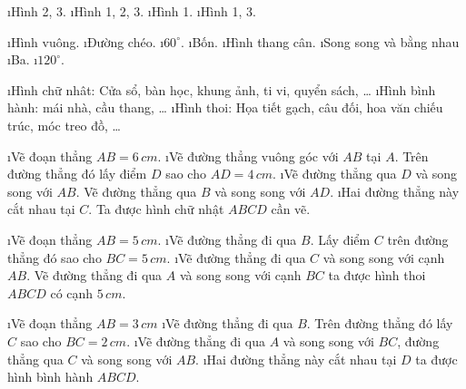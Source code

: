 \begin{Answer}{1}
		\begin{enumerate}[a), leftmargin=*]
			\i Hình 2, 3.
			\i Hình 1, 2, 3.
			\i Hình 1.
			\i Hình 1, 3.
		\end{enumerate}
	
\end{Answer}
\begin{Answer}{2}
		\begin{enumerate}[a), leftmargin=*]
			\i Hình vuông.
			\i Đường chéo.
			\i  $60^\circ$.
			\i Bốn.
			\i Hình thang cân.
			\i Song song và bằng nhau
			\i Ba.
			\i  $120^\circ$.
		\end{enumerate}
	
\end{Answer}
\begin{Answer}{3}
		\begin{enumerate}[--, leftmargin=*]
			\i Hình chữ nhât: Cửa sổ, bàn học, khung ảnh, ti vi, quyển sách, \ldots
			\i Hình bình hành: mái nhà, cầu thang, \ldots
			\i Hình thoi: Họa tiết gạch, câu đối, hoa văn chiếu trúc, móc treo đồ, \ldots
		\end{enumerate}
	
\end{Answer}
\begin{Answer}{4}
		\begin{enumerate}[Bước 1:, leftmargin=*]
			\i Vẽ đoạn thẳng $AB = 6\, cm$.
			\i Vẽ đường thẳng vuông góc với $AB$ tại  $A$. Trên đường thẳng đó lấy điểm $D$ sao cho $AD = 4\, cm$.
			\i Vẽ đường thẳng qua $D$ và song song với $AB$. Vẽ đường thẳng qua $B$ và song song với $AD$.
			\i Hai đường thẳng này cắt nhau tại $C$. Ta được hình chữ nhật $ABCD$ cần vẽ.
		\end{enumerate}
	
\end{Answer}
\begin{Answer}{5}
		\begin{enumerate}[Bước 1:, leftmargin=*]
			\i Vẽ đoạn thẳng $AB = 5\,cm$.
			\i Vẽ đường thẳng đi qua $B$. Lấy điểm $C$  trên đường thẳng đó sao cho $BC = 5\,cm$.
			\i Vẽ đường thẳng đi qua $C$ và song song với cạnh $AB$. Vẽ đường thẳng đi qua $A$ và song song với cạnh $BC$ ta được hình thoi $ABCD$ có cạnh $5\,cm$.
		\end{enumerate}
	
\end{Answer}
\begin{Answer}{6}
		\begin{enumerate}[Bước 1:, leftmargin=*]
			\i Vẽ đoạn thẳng $AB = 3\,cm$
			\i Vẽ đường thẳng đi qua $B$. Trên đường thẳng đó lấy $C$ sao cho $BC= 2\,cm$.
			\i Vẽ đường thẳng đi qua $A$ và song song với  $BC$, đường thẳng qua $C$  và song song với $AB$.
			\i Hai đường thẳng này cắt nhau tại  $D$ ta được hình bình hành $ABCD$.
		\end{enumerate}
	
\end{Answer}
